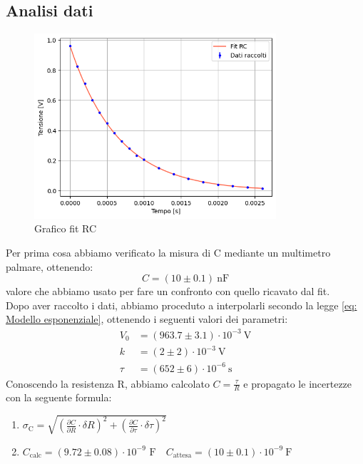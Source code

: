 \documentclass[letterpaper,12pt]{article}
\begin{document}
\subsection{Analisi dati}
\begin{figure}[h] 
  \centering
  \includegraphics[width=0.8\textwidth]{RC.png} %
  \caption{Grafico fit RC}
  \label{fig:fitRC}
\end{figure}
Per prima cosa abbiamo verificato la  misura  di C mediante un multimetro palmare, ottenendo: $$ C = (10 \pm 0.1)\ \text{nF}$$  valore che abbiamo usato per fare un confronto con quello ricavato dal fit.\\
Dopo aver raccolto i dati, abbiamo proceduto a interpolarli secondo la legge \eqref{eq: Modello esponenziale}, ottenendo i seguenti valori dei parametri:
\begin{align*}
    V_0 &= (963.7 \pm 3.1)\cdot 10^{-3}\ \text{V} \\
    k &= (2 \pm 2)\cdot 10^{-3}\ \text{V} \\
    \tau &= (652 \pm 6) \cdot 10^{-6}\ \text{s}
\end{align*}
Conoscendo la resistenza R, abbiamo calcolato $C = \frac{\tau}{R}$ e propagato le incertezze con la seguente formula:
\begin{enumerate}
    \item $\sigma_\text{C} = \sqrt{(\frac{\partial C}{\partial R} \cdot \delta R)^2 + (\frac{\partial C}{\partial \tau}\cdot \delta \tau)^2} $
    \item $ C_\text{calc}= (9.72 \pm 0.08) \cdot 10^{-9} \text{ F} \quad C_\text{attesa}= (10 \pm 0.1) \cdot 10^{-9}\ \text{F}$
\end{enumerate}

 \\
\end{document}
